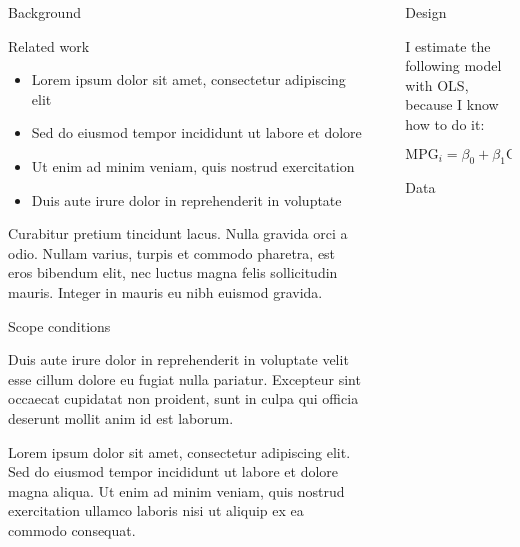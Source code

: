 \documentclass[final]{beamer}
\providecommand{\tightlist}{%
  \setlength{\itemsep}{0pt}\setlength{\parskip}{0pt}}
\newlength{\sepwidth}
\newlength{\colwidth}
\newcommand{\separatorcolumn}{\begin{column}{\sepwidth}\end{column}}
\begin{document}
\begin{frame}[t,fragile]
\begin{columns}[t]
\begin{column}{\colwidth}
\begin{block}{Background}
\end{block}

\begin{block}{Related work}

\begin{itemize}
\tightlist
\item
  Lorem ipsum dolor sit amet, consectetur adipiscing elit
\item
  Sed do eiusmod tempor incididunt ut labore et dolore
\item
  Ut enim ad minim veniam, quis nostrud exercitation
\item
  Duis aute irure dolor in reprehenderit in voluptate
\end{itemize}

Curabitur pretium tincidunt lacus. Nulla gravida orci a odio. Nullam
varius, turpis et commodo pharetra, est eros bibendum elit, nec luctus
magna felis sollicitudin mauris. Integer in mauris eu nibh euismod
gravida.

\end{block}

\begin{block}{Scope conditions}

Duis aute irure dolor in reprehenderit in voluptate velit esse cillum
dolore eu fugiat nulla pariatur. Excepteur sint occaecat cupidatat non
proident, sunt in culpa qui officia deserunt mollit anim id est laborum.

Lorem ipsum dolor sit amet, consectetur adipiscing elit. Sed do eiusmod
tempor incididunt ut labore et dolore magna aliqua. Ut enim ad minim
veniam, quis nostrud exercitation ullamco laboris nisi ut aliquip ex ea
commodo consequat.

\end{block}

\end{column}

\separatorcolumn

\begin{column}{\colwidth}

\begin{block}{Design}

I estimate the following model with OLS, because I know how to do it:

\[
\text{MPG}_i = \beta_0 + \beta_1 \text{Cyl}_i + \beta_2 \text{HP}_i + \varepsilon_i
\]

\end{block}

\begin{block}{Data}


\end{block}
\end{column}
\end{columns}
\end{frame}
\end{document}
